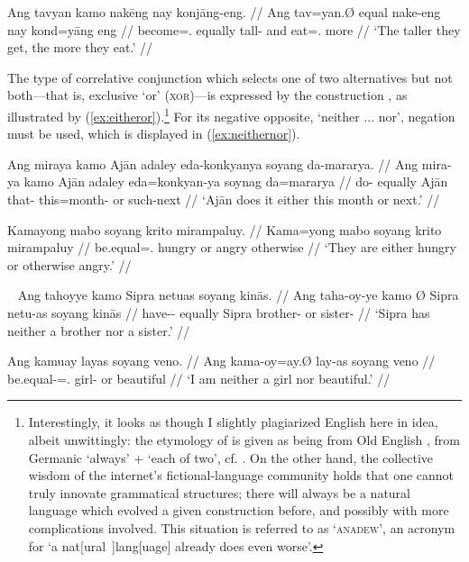 \ex\label{ex:thethe}
\begingl
	\gla Ang tavyan kamo nakēng nay konjāng-eng. //
	\glb Ang tav=yan.Ø equal nake-eng nay {kond=yāng eng} //
	\glc \AgtT{} become=\TsgM{}.\Top{} equally tall-\Comp{} and 
		{eat=\TsgM{}.\Aarg{} more} //
	\glft `The taller they get, the more they eat.' //
\endgl
\xe



The type of correlative conjunction which selects one of two alternatives but
not both---that is, exclusive `or' (\textsc{xor})---is expressed by the
construction , as illustrated
by (\ref{ex:eitheror}).\footnote{Interestingly, it looks as though I slightly
plagiarized English here in idea, albeit unwittingly: the etymology of
 is given as being from Old English , from
Germanic  `always' +  `each of two', cf.
\citet[either, adj. (and pron.) and adv. (and conj.)]{oed}. On the other hand,
the collective wisdom of the internet's fictional-language community holds that
one cannot truly innovate grammatical structures; there will always be a
natural language which evolved a given construction before, and possibly with
more complications involved. This situation is referred to as
`\textsc{anadew}', an acronym for `a nat[ural~]lang[uage] already does even
worse'.} For its negative opposite, `neither ... nor', negation must be used,
which is displayed in (\ref{ex:neithernor}).

\pex\label{ex:eitheror}
\a\label{ex:eitherorvb}\begingl
	\gla Ang miraya kamo Ajān adaley eda-konkyanya soyang da-mararya. //
	\glb Ang mira-ya kamo Ajān adaley eda=konkyan-ya soynag da=mararya //
	\glc \AgtT{} do-\TsgM{} equally Ajān that-\PargI{} this=month-\Loc{} 
		or such-next //
	\glft `Ajān does it either this month or next.' //
\endgl

\a\label{ex:eitherorpred}\begingl
	\gla Kamayong mabo soyang krito mirampaluy. //
	\glb Kama=yong mabo soyang krito mirampaluy //
	\glc be.equal=\TsgN{}.\Aarg{} hungry or angry otherwise //
	\glft `They are either hungry or otherwise angry.' //
\endgl

\xe

\pex~\label{ex:neithernor}
\a\label{ex:neithernorvb}\begingl
	\gla Ang tahoyye kamo {} Sipra netuas soyang kinās. //
	\glb Ang taha-oy-ye kamo Ø Sipra netu-as soyang kinās //
	\glc \AgtT{} have-\Neg{}-\TsgF{} equally \Top{} Sipra brother-\Parg{} 
		or sister-\Parg{} //
	\glft `Sipra has neither a brother nor a sister.' //
\endgl

\a\label{ex:neithernorpred}\begingl
	\gla Ang kamuay layas soyang veno. //
	\glb Ang kama-oy=ay.Ø lay-as soyang veno //
	\glc \AgtT{} be.equal-\Neg{}=\Fsg{}.\Aarg{} girl-\Parg{} or beautiful //
	\glft `I am neither a girl nor beautiful.' //
\endgl

\xe


